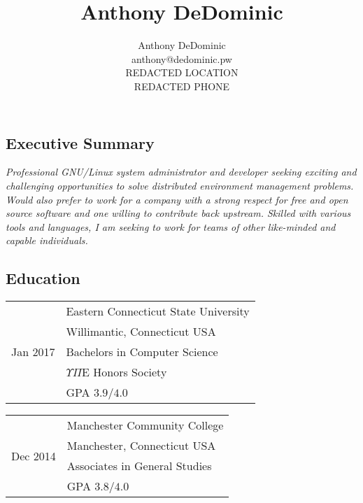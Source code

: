 \documentclass[letterpaper,]{article}
\author{Anthony DeDominic\\anthony@dedominic.pw\\REDACTED LOCATION\\REDACTED PHONE}
\title{Anthony DeDominic}
\begin{document}

\subsection{Executive Summary}\label{about}

\emph{Professional GNU/Linux system administrator and developer seeking
exciting and challenging opportunities to solve distributed environment
management problems. Would also prefer to work for a company with
a strong respect for free and open source software and one willing to
contribute back upstream. Skilled with various tools and languages, 
I am seeking to work for teams of other like-minded and capable individuals.}

\subsection{Education}\label{education}

\begin{table}[!ht]
    \begin{minipage}{0.5\linewidth}
    \centering
    \begin{tabular}{r|l}
        \multirow{6}{*}{Jan 2017}
        & Eastern Connecticut State University \\
        & Willimantic, Connecticut USA \\
        & Bachelors in Computer Science \\
        & $\Upsilon \Pi \mathrm{E}$ Honors Society \\
        & GPA $3.9/4.0$ \\
    \end{tabular}
    \end{minipage}
    \begin{minipage}{0.5\linewidth}
    \centering
    \begin{tabular}{r|l}
        \multirow{4}{*}{Dec 2014} 
        & Manchester Community College \\
        & Manchester, Connecticut USA \\
        & Associates in General Studies \\
        & GPA $3.8/4.0$ \\
    \end{tabular}
    \end{minipage}
\end{table}
\end{document}
